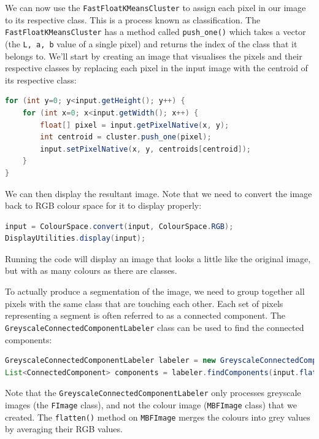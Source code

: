 \documentclass[10pt,a4paper,twoside,extrafontsizes]{memoir}
\begin{document}
We can now use the \verb+FastFloatKMeansCluster+ to assign each pixel in our image to its respective 
class. This is a process known as classification. The \verb+FastFloatKMeansCluster+ has a method 
called \verb+push_one()+ which takes a vector (the \verb+L, a, b+ value of a single pixel) and 
returns the index of the class that it belongs to. We'll start by creating an image that 
visualises the pixels and their respective classes by replacing each pixel in the input image 
with the centroid of its respective class:
\begin{lstlisting}[language=java]
for (int y=0; y<input.getHeight(); y++) {
    for (int x=0; x<input.getWidth(); x++) {
        float[] pixel = input.getPixelNative(x, y);
        int centroid = cluster.push_one(pixel);
        input.setPixelNative(x, y, centroids[centroid]);
    }
}
\end{lstlisting}
We can then display the resultant image. Note that we need to convert the image back to RGB 
colour space for it to display properly:
\begin{lstlisting}[language=java]
input = ColourSpace.convert(input, ColourSpace.RGB);
DisplayUtilities.display(input);
\end{lstlisting}
Running the code will display an image that looks a little like the original image, but with 
as many colours as there are classes.

To actually produce a segmentation of the image, we need to group together all pixels with 
the same class that are touching each other. Each set of pixels representing a segment is 
often referred to as a connected component. The \verb+GreyscaleConnectedComponentLabeler+ 
class can be used to find the connected components:
\begin{lstlisting}[language=java]
GreyscaleConnectedComponentLabeler labeler = new GreyscaleConnectedComponentLabeler();
List<ConnectedComponent> components = labeler.findComponents(input.flatten());
\end{lstlisting}
Note that the \verb+GreyscaleConnectedComponentLabeler+ only processes greyscale images 
(the \verb+FImage+ class), and not the colour image (\verb+MBFImage+ class) that we created. 
The \verb+flatten()+ method on \verb+MBFImage+ merges the colours into grey values by 
averaging their RGB values.
\end{document}
